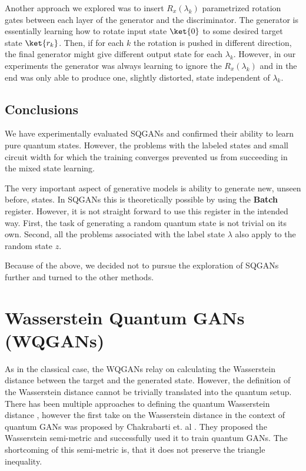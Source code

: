 Another approach we explored was to insert $R_x(\lambda_k)$ parametrized
rotation gates between each layer of the generator and the discriminator. The
generator is essentially learning how to rotate input state $\ket{0}$ to some
desired target state $\ket{r_k}$. Then, if for each $k$ the rotation is
pushed in different direction, the final generator might give different output
state for each $\lambda_k$. However, in our experiments the generator was always
learning to ignore the $R_x(\lambda_k)$ and in the end was only able to produce
one, slightly distorted, state independent of $\lambda_k$.

\subsection{Conclusions}
We have experimentally evaluated SQGANs and confirmed their ability to learn
pure quantum states. However, the problems with the labeled states and small
circuit width for which the training converges prevented us from succeeding in
the mixed state learning.

The very important aspect of generative models is ability to generate new,
unseen before, states. In SQGANs this is theoretically possible by using the
\textbf{Batch} register. However, it is not straight forward to use this register
in the intended way. First, the task of generating a random quantum state is not
trivial on its own. Second, all the problems associated with the label state
$\lambda$ also apply to the random state $z$. 

Because of the above, we decided not to pursue the exploration of SQGANs further
and turned to the other methods.


\section{Wasserstein Quantum GANs (WQGANs)}

As in the classical case, the WQGANs relay on calculating the Wasserstein
distance between the target and the generated state. However, the definition of 
the Wasserstein distance cannot be trivially translated into the quantum setup.
There has been multiple approaches to defining the quantum Wasserstein distance
\cite{carlen2012analog,chen2016matrix,chen2018Wasserstein,ning2013matrixvalued,peyré2017quantum,golse2021quantum,Golse_2016,yu2019quantum},
however the first take on the Wasserstein distance in the context of quantum
GANs was proposed by Chakrabarti et. al \cite{chakrabarti2019quantum}. They
proposed the Wasserstein semi-metric and successfully used it to train 
quantum GANs. The shortcoming of this semi-metric is, that it does not preserve the
triangle inequality.


